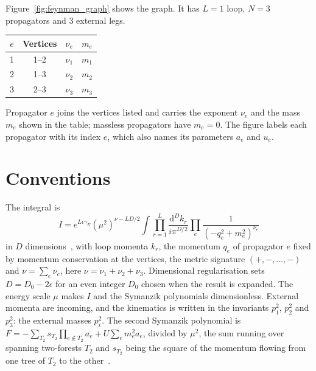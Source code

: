 \documentclass[11pt,a4paper]{article}
\begin{document}
Figure~\ref{fig:feynman_graph} shows the graph. It has $L = 1$ loop, $N = 3$ propagators and 3 external legs.
\begin{center}
\begin{tabular}{cccc}
\toprule
$e$ & Vertices & $\nu_e$ & $m_e$ \\
\midrule
1 & 1--2 & $\nu_{1}$ & $m_{1}$ \\
2 & 1--3 & $\nu_{2}$ & $m_{2}$ \\
3 & 2--3 & $\nu_{3}$ & $m_{3}$ \\
\bottomrule
\end{tabular}
\end{center}
Propagator $e$ joins the vertices listed and carries the exponent $\nu_e$ and the mass $m_e$ shown in the table; massless propagators have $m_e = 0$. The figure labels each propagator with its index $e$, which also names its parameters $a_e$ and $u_e$.

\section{Conventions}
The integral is
\begin{equation*}
I = e^{L \epsilon \gamma_E} \left(\mu^2\right)^{\nu - L D/2} \int \prod_{r=1}^{L} \frac{\mathrm{d}^D k_r}{i \pi^{D/2}} \prod_{e} \frac{1}{\left(-q_e^2 + m_e^2\right)^{\nu_e}}
\end{equation*}
in $D$ dimensions~\cite{weinzierl2022}, with loop momenta $k_r$, the momentum $q_e$ of propagator $e$ fixed by momentum conservation at the vertices, the metric signature $(+,-,\ldots,-)$ and $\nu = \sum_e \nu_e$, here $\nu = \nu_{1} + \nu_{2} + \nu_{3}$. Dimensional regularisation sets $D = D_0 - 2\epsilon$ for an even integer $D_0$ chosen when the result is expanded. The energy scale $\mu$ makes $I$ and the Symanzik polynomials dimensionless. External momenta are incoming, and the kinematics is written in the invariants $p^{2}_{1}$, $p^{2}_{2}$ and $p^{2}_{3}$: the external masses $p_i^2$. The second Symanzik polynomial is $F = -\sum_{T_2} s_{T_2} \prod_{e \notin T_2} a_e + U \sum_e m_e^2 a_e$, divided by $\mu^2$, the sum running over spanning two-forests $T_2$ and $s_{T_2}$ being the square of the momentum flowing from one tree of $T_2$ to the other~\cite{weinzierl2022}.
\end{document}
